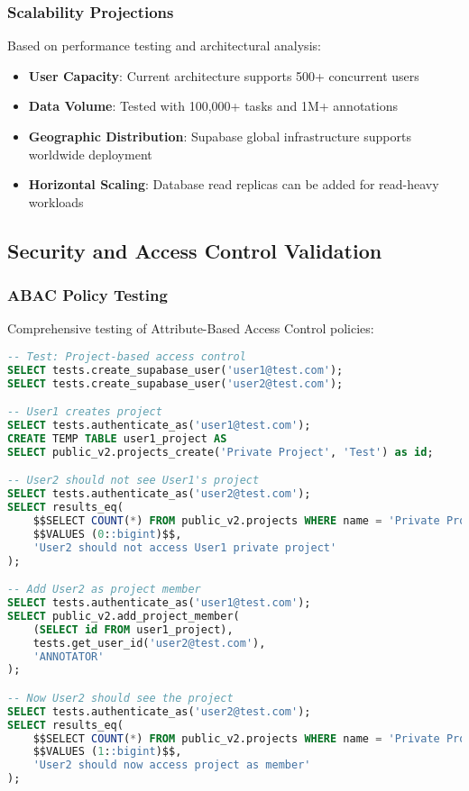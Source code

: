 \subsubsection{Scalability Projections}

Based on performance testing and architectural analysis:

\begin{itemize}
    \item \textbf{User Capacity}: Current architecture supports 500+ concurrent users
    \item \textbf{Data Volume}: Tested with 100,000+ tasks and 1M+ annotations
    \item \textbf{Geographic Distribution}: Supabase global infrastructure supports worldwide deployment
    \item \textbf{Horizontal Scaling}: Database read replicas can be added for read-heavy workloads
\end{itemize}

\subsection{Security and Access Control Validation}

\subsubsection{ABAC Policy Testing}

Comprehensive testing of Attribute-Based Access Control policies:

\begin{lstlisting}[language=sql, caption=ABAC Policy Test Example]
-- Test: Project-based access control
SELECT tests.create_supabase_user('user1@test.com');
SELECT tests.create_supabase_user('user2@test.com');

-- User1 creates project
SELECT tests.authenticate_as('user1@test.com');
CREATE TEMP TABLE user1_project AS
SELECT public_v2.projects_create('Private Project', 'Test') as id;

-- User2 should not see User1's project
SELECT tests.authenticate_as('user2@test.com');
SELECT results_eq(
    $$SELECT COUNT(*) FROM public_v2.projects WHERE name = 'Private Project'$$,
    $$VALUES (0::bigint)$$,
    'User2 should not access User1 private project'
);

-- Add User2 as project member
SELECT tests.authenticate_as('user1@test.com');
SELECT public_v2.add_project_member(
    (SELECT id FROM user1_project),
    tests.get_user_id('user2@test.com'),
    'ANNOTATOR'
);

-- Now User2 should see the project
SELECT tests.authenticate_as('user2@test.com');
SELECT results_eq(
    $$SELECT COUNT(*) FROM public_v2.projects WHERE name = 'Private Project'$$,
    $$VALUES (1::bigint)$$,
    'User2 should now access project as member'
);
\end{lstlisting}

